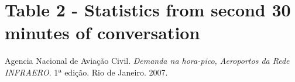 \documentclass[a4paper,10pt]{report}
\begin{document}
\section{Table 2 - Statistics from second 30 minutes of conversation}



\begin{thebibliography}{}

  Agencia Nacional de Aviação Civil.
  \emph{Demanda na hora-pico, Aeroportos da Rede INFRAERO}. 
  1ª edição. 
  Rio de Janeiro. 2007. 
\end{thebibliography}


\end{document}
